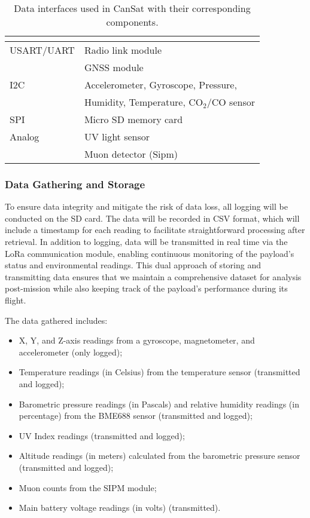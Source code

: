 \begin{table}[ht]
\centering
{}
\begin{tabular}{ll}
\rowcolor{DeepSkyBlue4}
\hline
\textbf{\color{white!50}{Data Interface}} & \textbf{\color{white!50}{Components}} \\ \hline
USART/UART & Radio link module \\
& GNSS module \\ 
\rowcolor{LightCyan1!50}I2C & Accelerometer, Gyroscope, Pressure, \\
\rowcolor{LightCyan1!50} &Humidity, Temperature, CO$_2$/CO sensor \\
SPI & Micro SD memory card \\ 
\rowcolor{LightCyan1!50}Analog & UV light sensor \\
\rowcolor{LightCyan1!50} & Muon detector (Sipm) \\
\hline
\end{tabular}
\caption{\small{Data interfaces used in CanSat with their corresponding components.}}
\label{tab:data-interfaces}
\end{table}

\subsubsection{Data Gathering and Storage}

To ensure data integrity and mitigate the risk of data loss, all logging will be conducted on the SD card. The data will be recorded in CSV format, which will include a timestamp for each reading to facilitate straightforward processing after retrieval. In addition to logging, data will be transmitted in real time via the LoRa communication module, enabling continuous monitoring of the payload's status and environmental readings. This dual approach of storing and transmitting data ensures that we maintain a comprehensive dataset for analysis post-mission while also keeping track of the payload's performance during its flight.

The data gathered includes:
\begin{itemize}
\item X, Y, and Z-axis readings from a gyroscope, magnetometer, and accelerometer (only logged);
\item Temperature readings (in Celsius) from the temperature sensor (transmitted and logged);
\item Barometric pressure readings (in Pascals) and relative humidity readings (in percentage) from the BME688 sensor (transmitted and logged);
\item UV Index readings (transmitted and logged);
\item Altitude readings (in meters) calculated from the barometric pressure sensor (transmitted and logged);
\item Muon counts from the SIPM module;
\item Main battery voltage readings (in volts) (transmitted).
\end{itemize}

